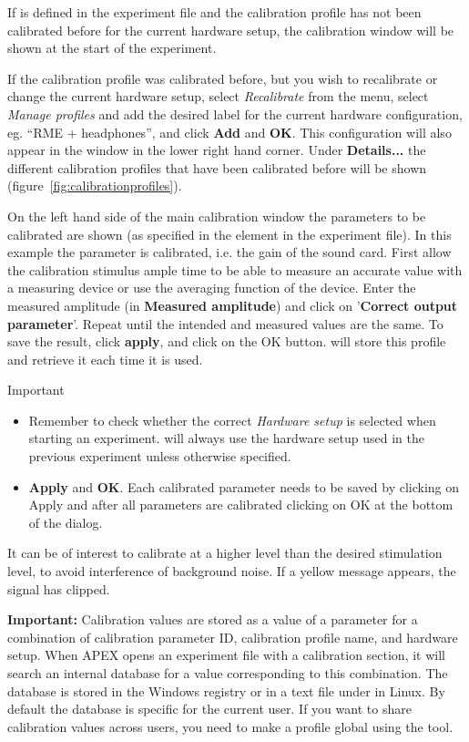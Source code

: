 If  is defined in the experiment file and the
calibration profile has not been calibrated before for the current
hardware setup, the calibration window will be shown at the start
of the experiment.


If the calibration profile was calibrated before, but you wish to
recalibrate or change the current hardware setup, select
\emph{Recalibrate} from the menu, select \emph{Manage profiles}
and add the desired label for the current hardware configuration,
eg. ``RME + headphones'', and click \textbf{Add} and \textbf{OK}.
This configuration will also appear in the \apex window in the
lower right hand corner. Under \textbf{Details...} the different
calibration profiles that have been calibrated before will be
shown (figure~\ref{fig:calibrationprofiles}).

On the left hand side of the main calibration window the
parameters to be calibrated are shown (as specified in the
 element in the experiment file). In this
example the parameter  is calibrated, i.e. the gain
of the sound card. First allow the calibration stimulus ample time
to be able to measure an accurate value with a measuring device or
use the averaging function of the device. Enter the measured
amplitude (in \textbf{Measured amplitude}) and click on
'\textbf{Correct output parameter}'. Repeat until the intended and
measured values are the same. To save the result, click
\textbf{apply}, and click on the OK button.  \apex will store this
profile and retrieve it each time it is used.


Important
\begin{itemize}

\item Remember to check whether the correct \emph{Hardware setup}
is selected when starting an experiment. \apex will always use the
hardware setup used in the previous experiment unless otherwise
specified.

\item \textbf{Apply} and \textbf{OK}. Each calibrated parameter
needs to be saved by clicking on Apply and after all parameters
are calibrated clicking on OK at the bottom of the dialog.
\end{itemize}

It can be of interest to calibrate at a higher level than the
desired stimulation level, to avoid interference of background
noise. If a yellow message appears, the signal has clipped.

\textbf{Important:} Calibration values are stored as a value of a parameter for a combination of calibration parameter ID, calibration profile name, and hardware setup. When APEX opens an experiment file with a calibration section, it will search an internal database for a value corresponding to this combination. The database is stored in the Windows registry or in a text file under  in Linux. By default the database is specific for the current user. If you want to share calibration values across users, you need to make a profile global using the  tool. 


